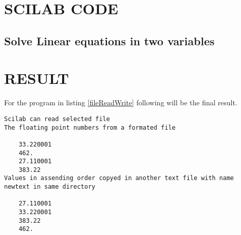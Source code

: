 \section*{SCILAB CODE}
\subsection*{Solve Linear equations in two variables}







\section*{RESULT}

For the program in listing \ref{fileReadWrite} following will be the final result.

\begin{lstlisting}[numbers=none]
 Scilab can read selected file
The floating point numbers from a formated file
 
    33.220001  
    462.       
    27.110001  
    383.22     
Values in assending order copyed in another text file with name newtext in same directory
 
    27.110001  
    33.220001  
    383.22     
    462.       
 \end{lstlisting}
 
 
